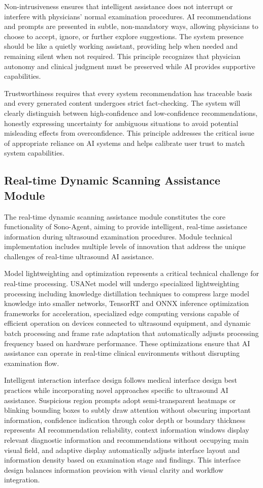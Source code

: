 Non-intrusiveness ensures that intelligent assistance does not interrupt or interfere with physicians' normal examination procedures. AI recommendations and prompts are presented in subtle, non-mandatory ways, allowing physicians to choose to accept, ignore, or further explore suggestions. The system presence should be like a quietly working assistant, providing help when needed and remaining silent when not required. This principle recognizes that physician autonomy and clinical judgment must be preserved while AI provides supportive capabilities.

Trustworthiness requires that every system recommendation has traceable basis and every generated content undergoes strict fact-checking. The system will clearly distinguish between high-confidence and low-confidence recommendations, honestly expressing uncertainty for ambiguous situations to avoid potential misleading effects from overconfidence. This principle addresses the critical issue of appropriate reliance on AI systems and helps calibrate user trust to match system capabilities.

\subsection{Real-time Dynamic Scanning Assistance Module}

The real-time dynamic scanning assistance module constitutes the core functionality of Sono-Agent, aiming to provide intelligent, real-time assistance information during ultrasound examination procedures. Module technical implementation includes multiple levels of innovation that address the unique challenges of real-time ultrasound AI assistance.

Model lightweighting and optimization represents a critical technical challenge for real-time processing. USANet model will undergo specialized lightweighting processing including knowledge distillation techniques to compress large model knowledge into smaller networks, TensorRT and ONNX inference optimization frameworks for acceleration, specialized edge computing versions capable of efficient operation on devices connected to ultrasound equipment, and dynamic batch processing and frame rate adaptation that automatically adjusts processing frequency based on hardware performance. These optimizations ensure that AI assistance can operate in real-time clinical environments without disrupting examination flow.

Intelligent interaction interface design follows medical interface design best practices while incorporating novel approaches specific to ultrasound AI assistance. Suspicious region prompts adopt semi-transparent heatmaps or blinking bounding boxes to subtly draw attention without obscuring important information, confidence indication through color depth or boundary thickness represents AI recommendation reliability, context information windows display relevant diagnostic information and recommendations without occupying main visual field, and adaptive display automatically adjusts interface layout and information density based on examination stage and findings. This interface design balances information provision with visual clarity and workflow integration.

